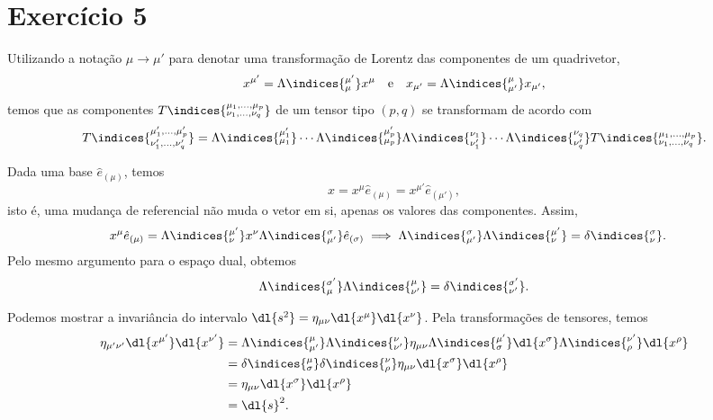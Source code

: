 \section*{Exercício 5}
Utilizando a notação \(\mu \to \mu'\) para denotar uma transformação de Lorentz das componentes de um quadrivetor,
\begin{equation*}
    x^{\mu'} = \Lambda\indices{^{\mu'}_\mu} x^\mu\quad\text{e}\quad x_{\mu'} = \Lambda\indices{^{\mu}_{\mu'}}x_{\mu'},
\end{equation*}
temos que as componentes \(T\indices{^{\mu_1,\dots,\mu_p}_{\nu_1,\dots,\nu_q}}\) de um tensor tipo \((p,q)\) se transformam de acordo com
\begin{equation*}
    T\indices{^{\mu'_1,\dots,\mu'_p}_{\nu'_1,\dots,\nu'_q}} = \Lambda\indices{^{\mu'_1}_{\mu_1}}\dotsm\Lambda\indices{^{\mu'_p}_{\mu_p}} \Lambda\indices{^{\nu_1}_{\nu'_1}}\dotsm\Lambda\indices{^{\nu_q}_{\nu'_q}} T\indices{^{\mu_1,\dots,\mu_p}_{\nu_1,\dots,\nu_q}}.
\end{equation*}

Dada uma base \(\hat{e}_{(\mu)}\), temos
\begin{equation*}
    x = x^\mu \hat{e}_{(\mu)} = x^{\mu'} \hat{e}_{(\mu')},
\end{equation*}
isto é, uma mudança de referencial não muda o vetor em si, apenas os valores das componentes. Assim,
\begin{align*}
    x^\mu \hat{e}_{(\mu)} &= \Lambda\indices{^{\mu'}_\nu} x^\nu \Lambda\indices{^\sigma_{\mu'}} \hat{e}_{(\sigma)} \implies \Lambda\indices{^\sigma_{\mu'}}\Lambda\indices{^{\mu'}_\nu}   = \delta\indices{^\sigma_\nu}.
\end{align*}
Pelo mesmo argumento para o espaço dual, obtemos
\begin{equation*}
    \Lambda\indices{^{\sigma'}_\mu}\Lambda\indices{^\mu_{\nu'}} = \delta\indices{^{\sigma'}_{\nu'}}.
\end{equation*}

Podemos mostrar a invariância do intervalo \(\dl{s^2} = \eta_{\mu\nu}\dl{x^{\mu}}\dl{x^{\nu}}\). Pela transformações de tensores, temos
\begin{align*}
    \eta_{\mu'\nu'}\dl{x^{\mu'}}\dl{x^{\nu'}} &= \Lambda\indices{^\mu_{\mu'}}\Lambda\indices{^\nu_{\nu'}}\eta_{\mu\nu} \Lambda\indices{^{\mu'}_{\sigma}}\dl{x^\sigma} \Lambda\indices{^{\nu'}_\rho}\dl{x^\rho}\\
                                              &= \delta\indices{^\mu_\sigma} \delta\indices{^\nu_{\rho}} \eta_{\mu\nu} \dl{x^\sigma} \dl{x^\rho}\\
                                              &= \eta_{\mu\nu} \dl{x^\sigma} \dl{x^\rho}\\
                                              &= \dl{s}^2.
\end{align*}

